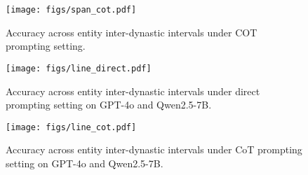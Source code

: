 \begin{figure*}[t]
    \centering
    \texttt{[image: figs/span\_cot.pdf]}
    \caption{Accuracy across entity inter-dynastic intervals under COT prompting setting.}
    \label{fig:acc_span_cot}
\end{figure*}


\begin{figure}[ht]
    \centering
    \texttt{[image: figs/line\_direct.pdf]}
    \caption{Accuracy across entity inter-dynastic intervals under direct prompting setting on GPT-4o and Qwen2.5-7B.
    }
    \label{fig:line_direct}
\end{figure}


\begin{figure}[ht]
    \centering
    \texttt{[image: figs/line\_cot.pdf]}
    \caption{Accuracy across entity inter-dynastic intervals under CoT prompting setting on GPT-4o and Qwen2.5-7B.
    }
    \label{fig:line_cot}
\end{figure}